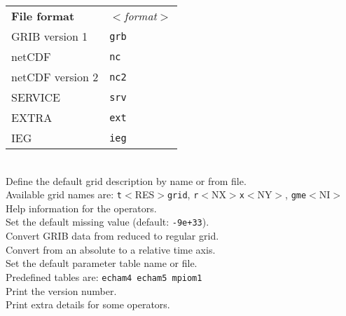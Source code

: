 \begin{tabbing}
         \> \parbox[r]{3in}{
              \vspace*{1mm}
              \hspace*{0cm}\begin{tabular}{|l|l|}
              \hline
              \rowcolor[gray]{.9}
              {\bf File format} & \sl $<$format$>$ \\
               GRIB version 1   & {\tt grb} \\
               netCDF           & {\tt nc}  \\
               netCDF version 2 & {\tt nc2} \\
               SERVICE          & {\tt srv} \\
               EXTRA            & {\tt ext} \\
               IEG              & {\tt ieg} \\
              \hline
              \end{tabular}
              \vspace*{1mm}
            } \\
         \> Define the default grid description by name or from file. \\
         \> Available grid names are: {\tt t}$<$RES$>${\tt grid}, {\tt r}$<$NX$>${\tt x}$<$NY$>$, {\tt gme}$<$NI$>$ \\
         \> Help information for the operators. \\
         \> Set the default missing value (default: {\tt-9e+33}). \\
         \> Convert GRIB data from reduced to regular grid. \\
         \> Convert from an absolute to a relative time axis. \\
         \> Set the default parameter table name or file.\\
         \> Predefined tables are:  {\tt echam4 echam5 mpiom1}\\
         \> Print the version number. \\
         \> Print extra details for some operators. \\
\end{tabbing}



